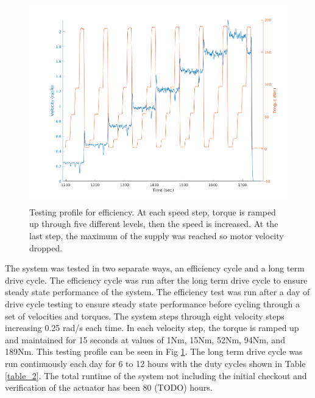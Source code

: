 \documentclass[letterpaper, 10 pt, conference]{ieeeconf}  %
\begin{document}
   \begin{figure}[!b]
      \centering
      \includegraphics[width=\linewidth]{eff_test_profile_v3}
      \caption{Testing profile for efficiency. At each speed step, torque is ramped up through five different levels, then the speed is increased. At the last step, the maximum of the supply was reached so motor velocity dropped.}
      \label{eff_profile}
   \end{figure}
   
The system was tested in two separate ways, an efficiency cycle and a long term drive cycle. The efficiency cycle was run after the long term drive cycle to ensure steady state performance of the system. The efficiency test was run after a day of drive cycle testing to ensure steady state performance before cycling through a set of velocities and torques. The system steps through eight velocity steps increasing 0.25 rad/s each time. In each velocity step, the torque is ramped up and maintained for 15 seconds at values of 1Nm, 15Nm, 52Nm, 94Nm, and 189Nm. This testing profile can be seen in Fig \ref{eff_profile}. The long term drive cycle was run continuously each day for 6 to 12 hours with the duty cycles shown in Table \ref{table_2}. The total runtime of the system not including the initial checkout and verification of the actuator has been 80 (TODO) hours. 
\end{document}
